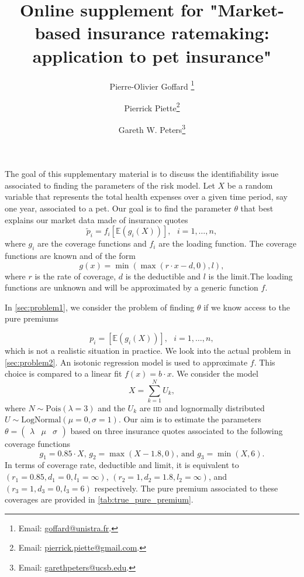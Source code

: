 \documentclass[10pt]{article}
\makeatletter
\newcommand*{\iid}{\textsc{iid}\@\xspace}
\renewcommand{\tilde}{\widetilde}
\makeatother
\begin{document}
\title{Online supplement for "Market-based insurance ratemaking: application to pet insurance"}
\author[1]{Pierre-Olivier Goffard \footnote{Email: \href{mailto:goffard@unistra.fr}{goffard@unistra.fr}.}}
\author[2,3]{Pierrick Piette\footnote{Email: \href{mailto:pierrick.piette@gmail.com}{pierrick.piette@gmail.com}.}}
\author[4]{Gareth W. Peters\footnote{Email: \href{mailto:garethpeters@ucsb.edu}{garethpeters@ucsb.edu}.}}

\maketitle
\vspace{3mm}
The goal of this supplementary material is to discuss the identifiability issue associated to finding the parameters of the risk model. Let $X$ be a random variable that represents the total health expenses over a given time period, say one year, associated to a pet. Our goal is to find the parameter $\theta$ that best explains our market data made of insurance quotes
$$
\tilde{p}_i = f_i\left[\mathbb{E}(g_i(X))\right],\text{ }i = 1,\ldots, n,
$$
where $g_i$ are the coverage functions and $f_i$ are the loading function. The coverage functions are known and of the form
$$
g(x) = \min(\max(r\cdot x - d, 0), l),
$$
where $r$ is the rate of coverage, $d$ is the deductible and $l$ is the limit.The loading functions are unknown and will be approximated by a generic function $f$. 

In \cref{sec:problem1}, we consider the problem of finding $\theta$ if we know access to the pure premiums 

$$
p_i = \left[\mathbb{E}(g_i(X))\right],\text{ }i = 1,\ldots, n,
$$
which is not a realistic situation in practice. We look into the actual problem in \cref{sec:problem2}. An isotonic regression model is used to approximate $f$. This choice  is compared to a linear fit $f(x) =b\cdot x$. We consider the model
$$
X = \sum_{k=1}^NU_k,
$$
where $N\sim\text{Pois}(\lambda = 3)$ and the $U_k$ are \iid and lognormally distributed $U\sim\text{LogNormal}(\mu =0 , \sigma = 1)$. Our aim is to estimate the parameters $\theta = (\begin{array}{ccc}\lambda& \mu & \sigma\end{array})$ based on three insurance quotes associated to the following coverage functions
$$
g_1 = 0.85\cdot X\text{, } g_2 = \max(X - 1.8, 0) \text{, and }g_3 = \min(X, 6).
$$
In terms of coverage rate, deductible and limit, it is equivalent to $(r_1 = 0.85, d_1 = 0, l_1 = \infty)$, $(r_2 = 1, d_2 = 1.8, l_2 = \infty)$, and $(r_3 = 1, d_3 = 0, l_3 = 6)$ respectively. The pure premium associated to these coverages are provided in \cref{tab:true_pure_premium}.
\end{document}
